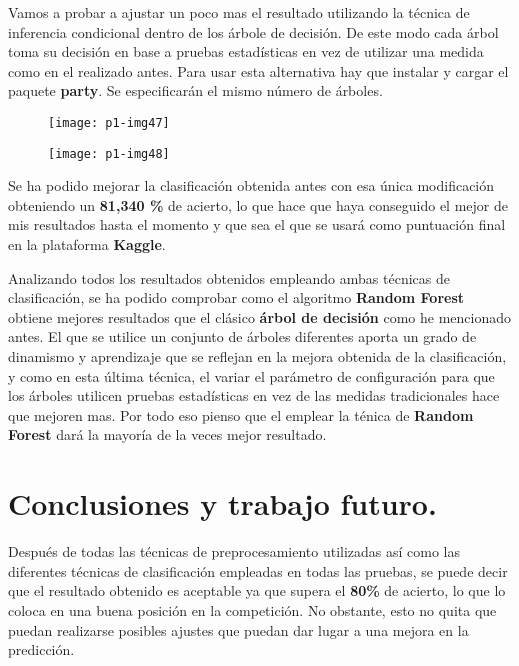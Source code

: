 \documentclass[10pt]{article}
\begin{document}
Vamos a probar a ajustar un poco mas el resultado utilizando la técnica de inferencia condicional dentro de los árbole de decisión. De este modo cada árbol toma su decisión en base a pruebas estadísticas en vez de utilizar una medida como en el realizado antes. Para usar esta alternativa hay que instalar y cargar el paquete \textbf{party}. Se especificarán el mismo número de árboles.\\

\begin{figure}[H]
	\begin{center}
 		\texttt{[image: p1-img47]}
	\end{center} 
\end{figure} 

\begin{figure}[H]
	\begin{center}
 		\texttt{[image: p1-img48]}
	\end{center} 
\end{figure} 

Se ha podido mejorar la clasificación obtenida antes con esa única modificación obteniendo un \textbf{81,340 \%} de acierto, lo que hace que haya conseguido el mejor de mis resultados hasta el momento y que sea el que se usará como puntuación final en la plataforma \textbf{Kaggle}.

Analizando todos los resultados obtenidos empleando ambas técnicas de clasificación,  se ha podido comprobar como el algoritmo \textbf{Random Forest} obtiene mejores resultados que el clásico \textbf{árbol de decisión} como he mencionado antes. El que se utilice un conjunto de árboles diferentes aporta un grado de dinamismo y aprendizaje que se reflejan en la mejora obtenida de la clasificación, y como en esta última técnica, el variar el parámetro de configuración para que los árboles utilicen pruebas estadísticas en vez de las medidas tradicionales hace que mejoren mas. Por todo eso pienso que el emplear la ténica de \textbf{Random Forest} dará la mayoría de la veces mejor resultado. 


\section{Conclusiones y trabajo futuro.}

Después de todas las técnicas de preprocesamiento utilizadas así como las diferentes técnicas de clasificación empleadas en todas las pruebas, se puede decir que el resultado obtenido es aceptable ya que supera el \textbf{80\%} de acierto, lo que lo coloca en una buena posición en la competición. No obstante, esto no quita que puedan realizarse posibles ajustes que puedan dar lugar a una mejora en la predicción. \\
\end{document}
